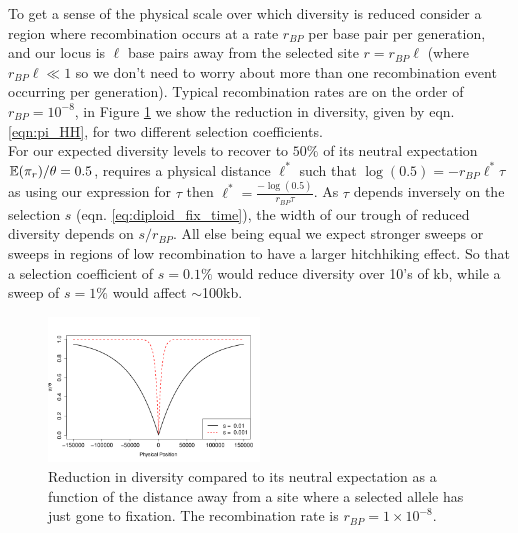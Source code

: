 To get a sense of the physical scale over which diversity is reduced
consider a region where recombination occurs at a rate $r_{BP}$ per
base pair per generation, and our locus is $ \ell $ base pairs away from the
selected site $r=r_{BP } \ell $ (where $r_{BP}  \ell  \ll 1$ so we don't need to
worry about more than one recombination event occurring per
generation). Typical
recombination rates are on the order of $r_{BP} = 10^{-8}$, in Figure
\ref{fig:hitchhiking_reduction} we show the reduction in diversity,
given by eqn. \eqref{eqn:pi_HH}, for two different selection coefficients.\\ 

For our expected diversity levels to recover to $50\%$ of
its neutral expectation $\mathbb{E}(\pi_r)/\theta=0.5$, requires a physical
distance $\ell^{*}$ such that $\log(0.5) = -r_{BP} \ell ^*\tau$ as using our
expression for $\tau$ then $ \ell^* = \frac{-\log(0.5)}{r_{BP} \tau }$. As
$\tau$ depends inversely on the selection $s$ (eqn. \eqref{eq:diploid_fix_time}), the width of our trough of reduced diversity depends on $s/r_{BP}$.
All else being equal we expect stronger sweeps or sweeps in regions of low
recombination to have a larger hitchhiking effect. So that a selection coefficient of $s=0.1\%$ would reduce
diversity over 10's of kb, while a sweep of $s=1\%$ would affect
$\sim$100kb.   \\


\begin{figure}
\begin{center}
\includegraphics[width=0.5\textwidth]{figures/hitchhiking_reduction.png}
\end{center}
\caption{Reduction in diversity compared to its neutral expectation as
a function of the distance away from a site where a selected allele
has just gone to fixation. The recombination rate is $r_{BP}= 1\times
10^{-8}$.} \label{fig:hitchhiking_reduction}
\end{figure}

